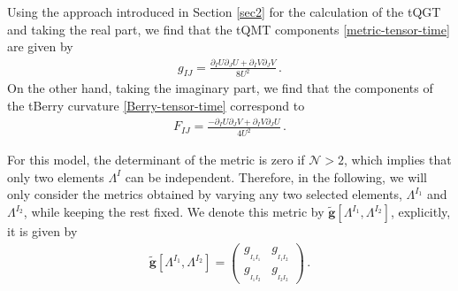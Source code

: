 \documentclass[12pt]{iopart}
\begin{document}
Using the approach introduced in Section \ref{sec2} for the calculation of the tQGT and taking the real part, we find that the tQMT components  \eqref{metric-tensor-time} are given by
\begin{align}
g_{IJ}=\frac{\partial_{I}U\partial_{J}U+\partial_{I}V\partial_{J}V}{8U^2}\,.
	\label{gijgeneral}
\end{align}
On the other hand, taking the imaginary part, we find that the components of the tBerry curvature \eqref{Berry-tensor-time} correspond to
\begin{align}
	F_{IJ}=\frac{-\partial_{I}U\partial_{J}V+\partial_{I}V\partial_{J}U}{4U^2}\,.
	\label{fijgeneral}
\end{align}

For this model, the determinant of the metric is zero if $\mathcal{N}>2$, which implies that only two elements $\Lambda^I$ can be independent. Therefore, in the following, we will only consider the metrics obtained by varying any two selected elements, $\Lambda^{\scriptscriptstyle I_1}$ and $\Lambda^{ \scriptscriptstyle I_2}$, while keeping the rest fixed. We denote this metric by $\tilde{\boldsymbol{g}}[\Lambda^{\scriptscriptstyle I_1},\Lambda^{\scriptscriptstyle I_2}]$, explicitly, it is given by
\begin{align}
\tilde{\boldsymbol{g}}  [\Lambda^{\scriptscriptstyle I_1},\Lambda^{\scriptscriptstyle I_2}]=\left(
	\begin{array}{cc}
		g_{_{I_1 I_1}} & g_{_{I_1 I_2}}  \\
		g_{_{I_1 I_2}} & g_{_{I_2 I_2}} 
	\end{array}
	\right)\,.
\end{align}
\end{document}
